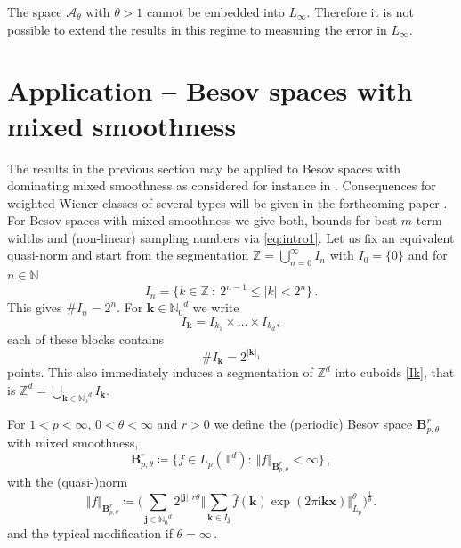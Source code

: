 \documentclass[11pt,reqno]{article}
\numberwithin{equation}{section}
\theoremstyle{definition}
\theoremstyle{plain}
\newcommand{\N}{\ensuremath{\mathbb{N}}}
\newcommand{\n}{\ensuremath{{\N}_0}}
\newcommand{\nd}{\ensuremath{\n^d}}
\newcommand{\zz}{\ensuremath{\mathbb{Z}}}
\newcommand{\Z}{{\ensuremath{\zz}^d}}
\newcommand{\tor}{\ensuremath{\mathbb{T}}}
\newcommand{\ca}{\ensuremath{\mathcal A}}
\newcommand{\bk}{\ensuremath{\mathbf k}}
\newcommand{\bj}{\ensuremath{\mathbf j}}
\newcommand{\bx}{\ensuremath{\mathbf x}}
\newcommand{\be}{\begin{equation}}
\newcommand{\ee}{\end{equation}}
\begin{document}
The space \(\ca_\theta\) with \(\theta > 1\) cannot be embedded into \(L_\infty\). Therefore it is not possible to extend the results in this regime to measuring the error in \(L_\infty\).




\section{Application -- Besov spaces with mixed smoothness}

The results in the previous section may be applied to Besov spaces with dominating mixed smoothness as considered for instance in \cite[Page 40, (3.3.3)]{DuTeUl18}. Consequences for weighted Wiener classes of several types will be given in the forthcoming paper \cite{MSU25}. For Besov spaces with mixed smoothness we give both, bounds for best $m$-term widths and (non-linear) sampling numbers via \eqref{eq:intro1}. Let us fix an equivalent quasi-norm and start from the segmentation \(\zz = \bigcup_{n=0}^\infty I_n\) 
with $I_0 = \{0\}$ and for $n\in \mathbb{N}$
 $$
 I_n = \big\{k \in \zz ~:~  2^{n-1} \leq \vert k\vert < 2^{n}\big\}\,.
 $$
This gives \(\#I_n = 2^{n}\).
For \( \bk \in \nd \) we write
 \be\label{Ik}
    I_{\bk} = I_{k_1} \times \ldots \times I_{k_d},
 \ee
each of these blocks contains 
 \be \label{Vol_Ik}
 \#I_{\bk} = 2^{\vert\bk \vert_1}  
 \ee
points. This also immediately induces a segmentation of \(\Z\) into cuboids \eqref{Ik}, that is \(\Z = \bigcup_{\bk \in \nd} I_{\bk} \).

For \(1 < p < \infty\), \(0 < \theta < \infty\) and \(r > 0\) we define the (periodic) Besov space \(\mathbf{B}^r_{p,\theta}\) with mixed smoothness,
\be \label{def_Besov}
\mathbf{B}^r_{p,\theta} \coloneqq \Big\{ f \in L_p(\tor^d):~  \Vert f \Vert_{\mathbf{B}^{r}_{p,\theta}} < \infty \Big\} \, ,
\ee
with the (quasi-)norm
\be \label{def_Besov_norm}
\Vert f \Vert_{ \mathbf{B}^r_{p,\theta}} \coloneqq \bigg( \sum_{\bj \in \nd }  2^{\vert \bj\vert_1 r \theta} \Big\Vert \sum_{\bk\in I_\bj } \hat{f}(\bk)\exp(2\pi \mathrm{i} \bk \bx)\Big\Vert_{L_p}^\theta\bigg)^{\frac{1}{\theta}}.
\ee 
and the typical modification if $\theta = \infty$\,.
\end{document}
